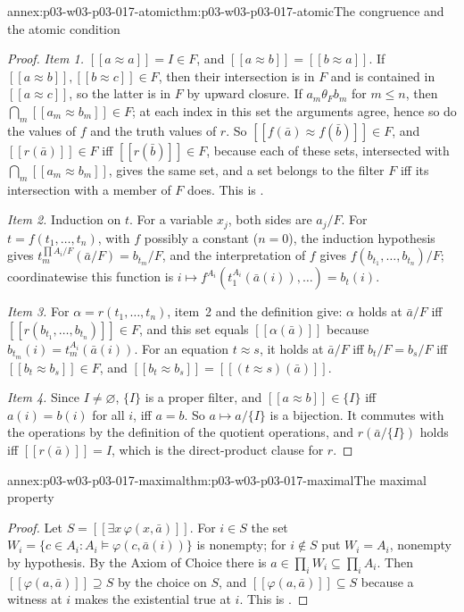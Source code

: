 \begin{annexitem}{annex:p03-w03-p03-017-atomic}{thm:p03-w03-p03-017-atomic}{The congruence and the atomic condition}
\begin{proof}
\emph{Item 1.}  \([\![a\approx a]\!]=I\in F\), and
\([\![a\approx b]\!]=[\![b\approx a]\!]\).  If
\([\![a\approx b]\!],[\![b\approx c]\!]\in F\), then their intersection is in
\(F\) and is contained in \([\![a\approx c]\!]\), so the latter is in \(F\)
by upward closure.  If \(a_m\mathrel{\theta_F}b_m\) for \(m\le n\), then
\(\bigcap_m[\![a_m\approx b_m]\!]\in F\); at each index in this set the
arguments agree, hence so do the values of \(f\) and the truth values of
\(r\).  So \([\![f(\bar a)\approx f(\bar b)]\!]\in F\), and
\([\![r(\bar a)]\!]\in F\) iff \([\![r(\bar b)]\!]\in F\), because each of
these sets, intersected with \(\bigcap_m[\![a_m\approx b_m]\!]\), gives the
same set, and a set belongs to the filter \(F\) iff its intersection with a
member of \(F\) does.  This is
\cite[V\S2, Lemma~2.2, p.~206]{BurrisSankappanavar2012}.

\emph{Item 2.}  Induction on \(t\).  For a variable \(x_j\), both sides are
\(a_j/F\).  For \(t=f(t_1,\ldots,t_n)\), with \(f\) possibly a constant
(\(n=0\)), the induction hypothesis gives
\(t_m^{\prod A_i/F}(\bar a/F)=b_{t_m}/F\), and the interpretation of \(f\)
gives \(f(b_{t_1},\ldots,b_{t_n})/F\); coordinatewise this function is
\(i\mapsto f^{A_i}(t_1^{A_i}(\bar a(i)),\ldots)=b_t(i)\).

\emph{Item 3.}  For \(\alpha=r(t_1,\ldots,t_n)\), item~2 and the definition
give: \(\alpha\) holds at \(\bar a/F\) iff
\([\![r(b_{t_1},\ldots,b_{t_n})]\!]\in F\), and this set equals
\([\![\alpha(\bar a)]\!]\) because \(b_{t_m}(i)=t_m^{A_i}(\bar a(i))\).  For
an equation \(t\approx s\), it holds at \(\bar a/F\) iff \(b_t/F=b_s/F\)
iff \([\![b_t\approx b_s]\!]\in F\), and
\([\![b_t\approx b_s]\!]=[\![(t\approx s)(\bar a)]\!]\).

\emph{Item 4.}  Since \(I\neq\varnothing\), \(\{I\}\) is a proper filter, and
\([\![a\approx b]\!]\in\{I\}\) iff \(a(i)=b(i)\) for all \(i\), iff \(a=b\).
So \(a\mapsto a/\{I\}\) is a bijection.  It commutes with the operations by
the definition of the quotient operations, and \(r(\bar a/\{I\})\) holds iff
\([\![r(\bar a)]\!]=I\), which is the direct-product clause for \(r\).
\end{proof}
\end{annexitem}

\begin{annexitem}{annex:p03-w03-p03-017-maximal}{thm:p03-w03-p03-017-maximal}{The maximal property}
\begin{proof}
Let \(S=[\![\exists x\,\varphi(x,\bar a)]\!]\).  For \(i\in S\) the set
\(W_i=\{c\in A_i:A_i\models\varphi(c,\bar a(i))\}\) is nonempty; for
\(i\notin S\) put \(W_i=A_i\), nonempty by hypothesis.  By the Axiom of
Choice there is \(a\in\prod_iW_i\subseteq\prod_iA_i\).  Then
\([\![\varphi(a,\bar a)]\!]\supseteq S\) by the choice on \(S\), and
\([\![\varphi(a,\bar a)]\!]\subseteq S\) because a witness at \(i\) makes
the existential true at \(i\).  This is
\cite[V\S2, Lemma~2.6, p.~207]{BurrisSankappanavar2012}.
\end{proof}
\end{annexitem}

